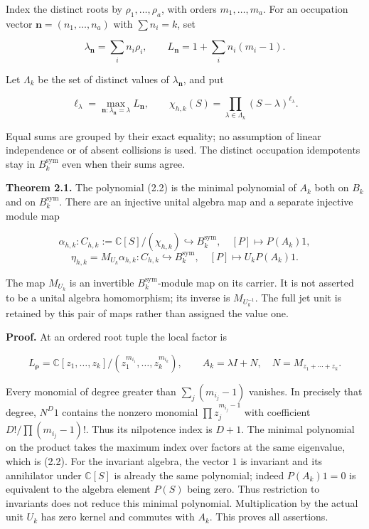 Index the distinct roots by \(\rho_1,\ldots,\rho_a\), with orders
\(m_1,\ldots,m_a\). For an occupation vector
\(\mathbf n=(n_1,\ldots,n_a)\) with \(\sum n_i=k\), set

\[\lambda_{\mathbf n}=\sum_i n_i\rho_i,\qquad
L_{\mathbf n}=1+\sum_i n_i(m_i-1).\tag{2.1}\]

Let \(\Lambda_k\) be the set of distinct values of
\(\lambda_{\mathbf n}\), and put

\[\ell_\lambda=\max_{\mathbf n:\lambda_{\mathbf n}=\lambda}L_{\mathbf n},\qquad
\boxed{\chi_{h,k}(S)=\prod_{\lambda\in\Lambda_k}(S-\lambda)^{\ell_\lambda}.}\tag{2.2}\]

Equal sums are grouped by their exact equality; no assumption of linear
independence or of absent collisions is used. The distinct occupation
idempotents stay in \(B_k^{\mathrm{sym}}\) even when their sums agree.

\textbf{Theorem 2.1.} The polynomial (2.2) is the minimal polynomial of
\(A_k\) both on \(B_k\) and on \(B_k^{\mathrm{sym}}\). There are an
injective unital algebra map and a separate injective module map

\[\alpha_{h,k}:C_{h,k}:=\mathbb C[S]/(\chi_{h,k})\hookrightarrow B_k^{\mathrm{sym}},\quad [P]\mapsto P(A_k)1,\]
\[\boxed{\eta_{h,k}=M_{U_k}\alpha_{h,k}:C_{h,k}\hookrightarrow B_k^{\mathrm{sym}},\quad
[P]\mapsto U_kP(A_k)1.}\tag{2.3}\]

The map \(M_{U_k}\) is an invertible \(B_k^{\mathrm{sym}}\)-module map
on its carrier. It is not asserted to be a unital algebra homomorphism;
its inverse is \(M_{U_k^{-1}}\). The full jet unit is retained by this
pair of maps rather than assigned the value one.

\textbf{Proof.} At an ordered root tuple the local factor is

\[L_{\boldsymbol\rho}=\mathbb C[z_1,\ldots,z_k]/(z_1^{m_{i_1}},\ldots,z_k^{m_{i_k}}),\qquad
A_k=\lambda I+N,\quad N=M_{z_1+\cdots+z_k}.\]

Every monomial of degree greater than \(\sum_j(m_{i_j}-1)\) vanishes. In
precisely that degree, \(N^D1\) contains the nonzero monomial
\(\prod z_j^{m_{i_j}-1}\) with coefficient \(D!/\prod(m_{i_j}-1)!\).
Thus its nilpotence index is \(D+1\). The minimal polynomial on the
product takes the maximum index over factors at the same eigenvalue,
which is (2.2). For the invariant algebra, the vector \(1\) is invariant
and its annihilator under \(\mathbb C[S]\) is already the same
polynomial; indeed \(P(A_k)1=0\) is equivalent to the algebra element
\(P(S)\) being zero. Thus restriction to invariants does not reduce this
minimal polynomial. Multiplication by the actual unit \(U_k\) has zero
kernel and commutes with \(A_k\). This proves all assertions.

